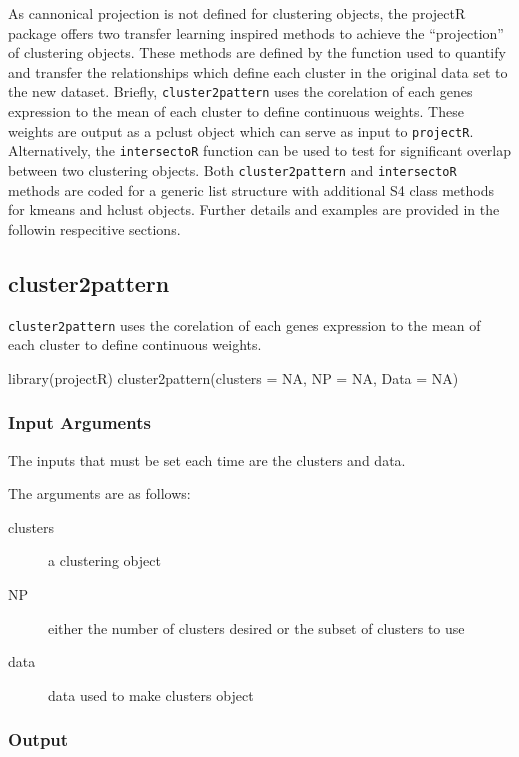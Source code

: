 \documentclass[]{article}
\renewenvironment{verbatim}{\color{codecolor}\begin{myshaded}\begin{oldverbatim}}{\end{oldverbatim}\end{myshaded}}
\begin{document}
As cannonical projection is not defined for clustering objects, the projectR package offers two transfer learning inspired methods to achieve the ``projection'' of clustering objects. These methods are defined by the function used to quantify and transfer the relationships which define each cluster in the original data set to the new dataset. Briefly, \texttt{cluster2pattern} uses the corelation of each genes expression to the mean of each cluster to define continuous weights. These weights are output as a pclust object which can serve as input to \texttt{projectR}. Alternatively, the \texttt{intersectoR} function can be used to test for significant overlap between two clustering objects. Both \texttt{cluster2pattern} and \texttt{intersectoR} methods are coded for a generic list structure with additional S4 class methods for kmeans and hclust objects. Further details and examples are provided in the followin respecitive sections.

\hypertarget{cluster2pattern}{%
\subsection{cluster2pattern}\label{cluster2pattern}}

\texttt{cluster2pattern} uses the corelation of each genes expression to the mean of each cluster to define continuous weights.

\begin{verbatim}
library(projectR)
cluster2pattern(clusters = NA, NP = NA, Data = NA)
\end{verbatim}

\hypertarget{input-arguments-2}{%
\subsubsection{Input Arguments}\label{input-arguments-2}}

The inputs that must be set each time are the clusters and data.

The arguments are as follows:

\begin{description}
\item[clusters]{a clustering object}
\item[NP]{either the number of clusters desired or the subset of clusters to use}
\item[data]{data used to make clusters object}
\end{description}

\hypertarget{output-2}{%
\subsubsection{Output}\label{output-2}}
\end{document}
